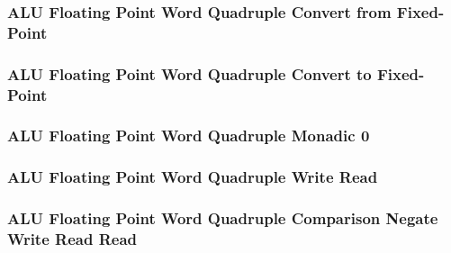 \subsubsection[{\small ALU Floating Point Word Quadruple Convert from Fixed-Point}]{ALU Floating Point Word Quadruple Convert from Fixed-Point} \label{sec:format-ALU-FWQFLOAT}



\subsubsection[{\small ALU Floating Point Word Quadruple Convert to Fixed-Point}]{ALU Floating Point Word Quadruple Convert to Fixed-Point} \label{sec:format-ALU-FWQFIXED}



\subsubsection[{\small ALU Floating Point Word Quadruple Monadic 0}]{ALU Floating Point Word Quadruple Monadic 0} \label{sec:format-ALU-FWQMO0}



\subsubsection[{\small ALU Floating Point Word Quadruple Write Read}]{ALU Floating Point Word Quadruple Write Read} \label{sec:format-ALU-FWQWR}



\subsubsection[{\small ALU Floating Point Word Quadruple Comparison Negate Write Read Read}]{ALU Floating Point Word Quadruple Comparison Negate Write Read Read} \label{sec:format-ALU-FWQCNWRR}



